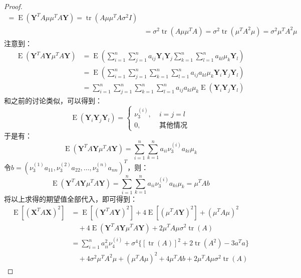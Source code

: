 \begin{proof}
\begin{align*}
		=\operatorname{E}(\mathbf{Y}^TA\mu\mu^TA\mathbf{Y})
		=\operatorname{tr}(A\mu\mu^TA\sigma^2I) \\
		&=\sigma^2\operatorname{tr}(A\mu\mu^TA)
		=\sigma^2\operatorname{tr}(\mu^TA^2\mu)
		=\sigma^2\mu^TA^2\mu
	\end{align*}
	注意到：
	\begin{align*}
		\operatorname{E}(\mathbf{Y}^TA\mathbf{Y}\mu^TA\mathbf{Y})
		&=\operatorname{E}\left(\sum_{i=1}^{n}\sum_{j=1}^{n}a_{ij}\mathbf{Y}_i\mathbf{Y}_j\sum_{k=1}^{n}\sum_{l=1}^{n}a_{kl}\mu_k\mathbf{Y}_l\right) \\
		&=\operatorname{E}\left(\sum_{i=1}^{n}\sum_{j=1}^{n}\sum_{k=1}^{n}\sum_{l=1}^{n}a_{ij}a_{kl}\mu_k\mathbf{Y}_i\mathbf{Y}_j\mathbf{Y}_l\right) \\
		&=\sum_{i=1}^{n}\sum_{j=1}^{n}\sum_{k=1}^{n}\sum_{l=1}^{n}a_{ij}a_{kl}\mu_k\operatorname{E}(\mathbf{Y}_i\mathbf{Y}_j\mathbf{Y}_l)
	\end{align*}
	和之前的讨论类似，可以得到：
	\begin{equation*}
		\operatorname{E}(\mathbf{Y}_i\mathbf{Y}_j\mathbf{Y}_l)=
		\begin{cases}
			\nu_3^{(i)},\;&i=j=l \\
			0,\;&\text{其他情况}
		\end{cases}
	\end{equation*}
	于是有：
	\begin{equation*}
		\operatorname{E}(\mathbf{Y}^TA\mathbf{Y}\mu^TA\mathbf{Y})
		=\sum_{i=1}^{n}\sum_{k=1}^{n}a_{ii}\nu_3^{(i)}a_{ki}\mu_k
	\end{equation*}
	令$b=(\nu_3^{(1)}a_{11},\nu_3^{(2)}a_{22},\dots,\nu_3^{(n)}a_{nn})^T$，则：
	\begin{equation*}
		\operatorname{E}(\mathbf{Y}^TA\mathbf{Y}\mu^TA\mathbf{Y})
		=\sum_{i=1}^{n}\sum_{k=1}^{n}a_{ii}\nu_3^{(i)}a_{ki}\mu_k=\mu^TAb
	\end{equation*}
	将以上求得的期望值全部代入，即可得到：
	\begin{align*}
		\operatorname{E}[(\mathbf{X}^TA\mathbf{X})^2]
		&=\operatorname{E}[(\mathbf{Y}^TA\mathbf{Y})^2]+4\operatorname{E}[(\mu^TA\mathbf{Y})^2]+(\mu^TA\mu)^2 \\
		&\quad+4\operatorname{E}(\mathbf{Y}^TA\mathbf{Y}\mu^TA\mathbf{Y})+2\mu^TA\mu\sigma^2\operatorname{tr}(A) \\
		&=\sum_{i=1}^{n}a_{ii}^2\nu_4^{(i)}+\sigma^4\{[\operatorname{tr}(A)]^2+2\operatorname{tr}(A^2)-3a^Ta\} \\
		&\quad+4\sigma^2\mu^TA^2\mu+(\mu^TA\mu)^2+4\mu^TAb+2\mu^TA\mu\sigma^2\operatorname{tr}(A)

\end{align*}
\end{proof}
